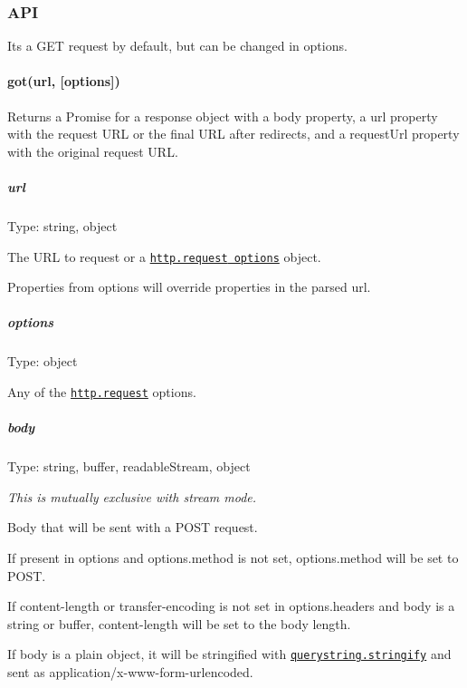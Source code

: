 \subsubsection*{A\+PI}

It\textquotesingle{}s a {\ttfamily G\+ET} request by default, but can be changed in {\ttfamily options}.

\paragraph*{got(url, \mbox{[}options\mbox{]})}

Returns a Promise for a {\ttfamily response} object with a {\ttfamily body} property, a {\ttfamily url} property with the request U\+RL or the final U\+RL after redirects, and a {\ttfamily request\+Url} property with the original request U\+RL.

\subparagraph*{url}

Type\+: {\ttfamily string}, {\ttfamily object}

The U\+RL to request or a \href{https://nodejs.org/api/http.html#http_http_request_options_callback}{\tt {\ttfamily http.\+request} options} object.

Properties from {\ttfamily options} will override properties in the parsed {\ttfamily url}.

\subparagraph*{options}

Type\+: {\ttfamily object}

Any of the \href{http://nodejs.org/api/http.html#http_http_request_options_callback}{\tt {\ttfamily http.\+request}} options.

\subparagraph*{body}

Type\+: {\ttfamily string}, {\ttfamily buffer}, {\ttfamily readable\+Stream}, {\ttfamily object}

{\itshape This is mutually exclusive with stream mode.}

Body that will be sent with a {\ttfamily P\+O\+ST} request.

If present in {\ttfamily options} and {\ttfamily options.\+method} is not set, {\ttfamily options.\+method} will be set to {\ttfamily P\+O\+ST}.

If {\ttfamily content-\/length} or {\ttfamily transfer-\/encoding} is not set in {\ttfamily options.\+headers} and {\ttfamily body} is a string or buffer, {\ttfamily content-\/length} will be set to the body length.

If {\ttfamily body} is a plain object, it will be stringified with \href{https://nodejs.org/api/querystring.html#querystring_querystring_stringify_obj_sep_eq_options}{\tt {\ttfamily querystring.\+stringify}} and sent as {\ttfamily application/x-\/www-\/form-\/urlencoded}.


